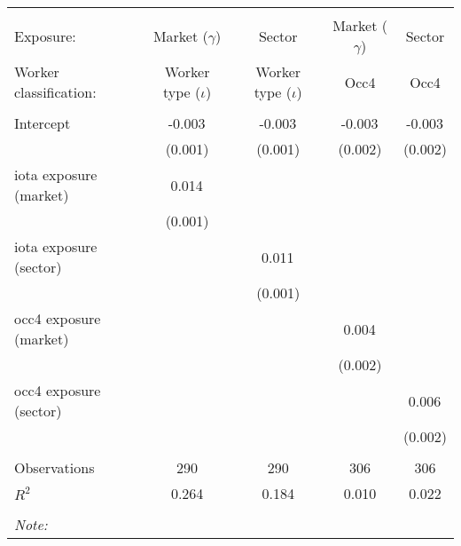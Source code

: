 \begin{tabular}{@{\extracolsep{5pt}}lcccc}
\\[-1.8ex]\hline
\hline \\[-1.8ex]
\hline \\[-1.8ex]
 Exposure: & Market ($\gamma$) & Sector & Market ($\gamma$) & Sector \\
 Worker classification: & Worker type ($\iota$) & Worker type ($\iota$) & Occ4 & Occ4 \\
 \hline &  &  &  &  \\
 Intercept & -0.003$^{}$ & -0.003$^{}$ & -0.003$^{}$ & -0.003$^{}$ \\
  & (0.001) & (0.001) & (0.002) & (0.002) \\
 iota exposure (market) & 0.014$^{}$ & & & \\
  & (0.001) & & & \\
 iota exposure (sector) & & 0.011$^{}$ & & \\
  & & (0.001) & & \\
 occ4 exposure (market) & & & 0.004$^{}$ & \\
  & & & (0.002) & \\
 occ4 exposure (sector) & & & & 0.006$^{}$ \\
  & & & & (0.002) \\
\hline \\[-1.8ex]
 Observations & 290 & 290 & 306 & 306 \\
 $R^2$ & 0.264 & 0.184 & 0.010 & 0.022 \\
\hline
\hline \\[-1.8ex]
\textit{Note:}\end{tabular}